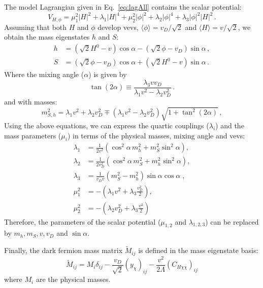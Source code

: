 \documentclass[a4paper,11pt]{article}
\begin{document}
The model Lagrangian given in Eq.~\eqref{eq:lagAll} contains the scalar potential:
\begin{equation}
V_{H,\phi} = \mu_1^2 |H|^2 + \lambda_1 |H|^4  + \mu_{2}^2 |\phi|^2 + \lambda_2 |\phi|^4 + \lambda_3 |\phi|^2 |H|^2 \,.
\end{equation}
Assuming that both $H$ and $\phi$ develop vevs, $\langle \phi \rangle = v_D/\sqrt{2}$ and $\langle H \rangle = v/\sqrt{2}$, we obtain the mass eigenstates $h$ and $S$:
\begin{align}
	h &= (\sqrt{2} H^0 -v) \cos \alpha - (\sqrt{2} \phi-v_D) \sin \alpha \,,  \nonumber\\
	S &= (\sqrt{2} \phi - v_D) \cos \alpha + (\sqrt{2} H^0 - v) \sin \alpha \,. \label{eq:alpha}
\end{align}
Where the mixing angle ($\alpha$) is given by
\begin{equation}
	\tan(2 \alpha) \equiv \frac{\lambda_{3} v v_D}{\lambda_1 v^2-\lambda_2 v_D^2}\,.
	\label{tan}
\end{equation}
and with masses: 
\begin{equation}
m_{S,h}^2 = \lambda_{1} v^2+\lambda_{2} v_D^2 \mp \left(\lambda_{1} v^2-\lambda_{2} v_D^2\right) \sqrt{1 + \tan^2(2 \alpha)}\,,
   \label{mhs}
\end{equation}
Using the above equations, we can express the quartic couplings ($\lambda_i$) and the mass parameters ($\mu_i$) in terms of the physical masses, mixing angle and vevs:  
\begin{align}
 \lambda_1 &=  \frac{1}{2 v^2}\left(\cos^2\alpha\, m_{h}^2+m_{S}^2 \sin^2\alpha\right),\\
 \lambda_2 &= \frac{1}{2 v_D^2} \left(\cos^2\alpha \, m_{S}^2+ m_{h}^2 \sin^2 \alpha\right),\\
  \lambda_{3} &= \frac{1}{v_D v} \left(m_{S}^2 -m_h^2 \right) \sin\alpha \cos\alpha \; ,\\
  \mu_1^2 &=  -\left(\lambda_{1}v^2 + \lambda_{3} \frac{v_D^2}{2} \right), 
  \quad\\
  \mu_2^2 &= -\left(\lambda_{2} v_D^2 + \lambda_{3}\frac{v^2}{2}\right)
\end{align}
Therefore, the parameters of the scalar potential ($\mu_{1,2}$ and $\lambda_{1,2,3}$) can be replaced by $m_{h},m_S,v,v_D$ and $\sin\alpha$.

Finally, the dark fermion mass matrix $\tilde{M}_{ij}$ is defined in the mass eigenstate basis:
\begin{equation*}
	\tilde{M}_{ij} = M_i \delta_{ij} -\frac{v_D}{\sqrt{2}} (y_{\chi})_{ij} - \frac{v^2}{2\Lambda} (C_{H\chi\chi})_{ij}
\end{equation*}
where $M_i$ are the physical masses.
\end{document}
